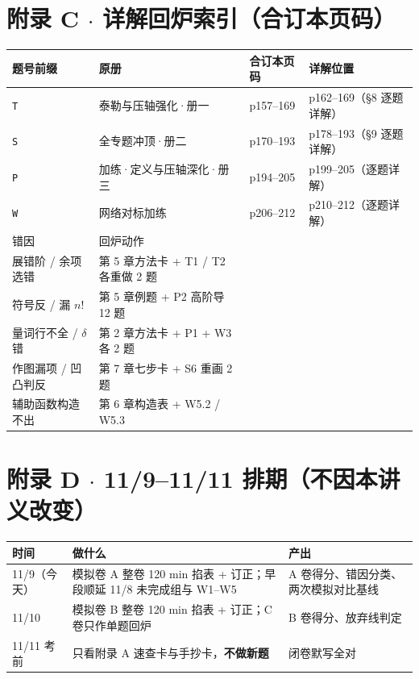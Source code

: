 \section*{附录 C $\cdot$ 详解回炉索引（合订本页码）}
{\footnotesize
\begin{longtable}{@{}p{2.1cm}p{4.0cm}p{3.0cm}p{6.1cm}@{}}
\toprule
\textbf{题号前缀} & \textbf{原册} & \textbf{合订本页码} & \textbf{详解位置} \\
\midrule
\texttt{T} & 泰勒与压轴强化·册一 & p157--169 & p162--169（§8 逐题详解） \\
\texttt{S} & 全专题冲顶·册二 & p170--193 & p178--193（§9 逐题详解） \\
\texttt{P} & 加练·定义与压轴深化·册三 & p194--205 & p199--205（逐题详解） \\
\texttt{W} & 网络对标加练 & p206--212 & p210--212（逐题详解） \\
\midrule
错因 & 回炉动作 & & \\
展错阶 / 余项选错 & 第 5 章方法卡 + T1 / T2 各重做 2 题 & & \\
符号反 / 漏 $n!$ & 第 5 章例题 + P2 高阶导 12 题 & & \\
量词行不全 / $\delta$ 错 & 第 2 章方法卡 + P1 + W3 各 2 题 & & \\
作图漏项 / 凹凸判反 & 第 7 章七步卡 + S6 重画 2 题 & & \\
辅助函数构造不出 & 第 6 章构造表 + W5.2 / W5.3 & & \\
\bottomrule
\end{longtable}}

\section*{附录 D $\cdot$ 11/9--11/11 排期（不因本讲义改变）}
{\footnotesize
\begin{longtable}{@{}p{2.1cm}p{6.0cm}p{7.1cm}@{}}
\toprule
\textbf{时间} & \textbf{做什么} & \textbf{产出} \\
\midrule
11/9（今天） & 模拟卷 A 整卷 120 min 掐表 + 订正；早段顺延 11/8 未完成组与 W1--W5 & A 卷得分、错因分类、两次模拟对比基线 \\
11/10 & 模拟卷 B 整卷 120 min 掐表 + 订正；C 卷只作单题回炉 & B 卷得分、放弃线判定 \\
11/11 考前 & 只看附录 A 速查卡与手抄卡，\textbf{不做新题} & 闭卷默写全对 \\
\bottomrule
\end{longtable}}
